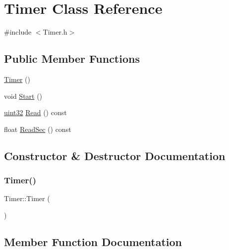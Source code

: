 \hypertarget{class_timer}{}\section{Timer Class Reference}
\label{class_timer}


{\ttfamily \#include $<$Timer.\+h$>$}

\subsection*{Public Member Functions}
\begin{DoxyCompactItemize}
\item 
\mbox{\hyperlink{class_timer_a5f16e8da27d2a5a5242dead46de05d97}{Timer}} ()
\item 
void \mbox{\hyperlink{class_timer_a4e607b129b392c11adddd9641a320436}{Start}} ()
\item 
\mbox{\hyperlink{_defs_8h_ada4c95a4173a4bb540c8a7f80f3665d2}{uint32}} \mbox{\hyperlink{class_timer_a86effb801b378c8b526ab4c535439306}{Read}} () const
\item 
float \mbox{\hyperlink{class_timer_af19579fc19223d2de4a5d0eb3834b8a7}{Read\+Sec}} () const
\end{DoxyCompactItemize}


\subsection{Constructor \& Destructor Documentation}
\mbox{\label{class_timer_a5f16e8da27d2a5a5242dead46de05d97}} 
\subsubsection{\texorpdfstring{Timer()}{Timer()}}
{\footnotesize\ttfamily Timer\+::\+Timer (\begin{DoxyParamCaption}{ }\end{DoxyParamCaption})}



\subsection{Member Function Documentation}
\mbox{\label{class_timer_a86effb801b378c8b526ab4c535439306}} 
